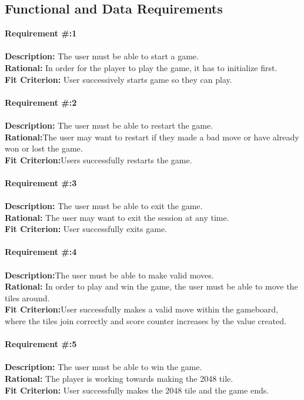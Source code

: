 \documentclass[12pt]{article}
\begin{document}
\subsection{Functional and Data Requirements}
\textbf {Requirement \#:1} \\\\
\textbf {Description:} The user must be able to start a game.\\
\textbf {Rational:} In order for the player to play the game, it has to initialize first.\\
\textbf {Fit Criterion:} User successively starts game so they can play. \\\\

\textbf {Requirement \#:2}  \\\\
\textbf {Description:} The user must be able to restart the game.\\
\textbf {Rational:}The user may want to restart if they made a bad move or have already won or lost the game. \\
\textbf {Fit Criterion:}Users successfully restarts the game. \\\\

\textbf {Requirement \#:3} \\\\
\textbf {Description:} The user must be able to exit the game.\\
\textbf {Rational:} The user may want to exit the session at any time.\\
\textbf {Fit Criterion:} User successfully exits game. \\\\

\textbf {Requirement \#:4} \\\\
\textbf {Description:}The user must be able to make valid moves. \\
\textbf {Rational:} In order to play and win the game, the user must be able to move the tiles around. \\
\textbf {Fit Criterion:}User successfully makes a valid move within the gameboard, where the tiles join correctly and score counter increases by the value created. \\\\

\textbf {Requirement \#:5}  \\\\
\textbf {Description:} The user must be able to win the game.\\
\textbf {Rational:} The player is working towards making the 2048 tile. \\
\textbf {Fit Criterion:} User successfully makes the 2048 tile and the game ends. \\\\
\end{document}
